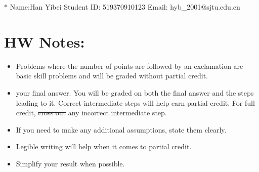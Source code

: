 \documentclass[12pt,a4paper]{article}
\begin{document}
\noindent

\noindent{}

\begin{center}

\footnotesize{\color{blue}$*$ Name:Han Yibei \quad Student ID: 519370910123 \quad Email: hyb\_2001@sjtu.edu.cn}
\end{center}

\section*{HW Notes:}
\begin{itemize}
    \item Problems where the number of points are followed by an exclamation are basic skill problems and will be graded without partial credit.
    \item {} your final answer. You will be graded on both the final answer and the steps leading to it. Correct intermediate steps will help earn partial credit.
    For full credit, \sout{cross out} any incorrect intermediate step.
    \item If you need to make any additional assumptions, state them clearly.
    \item Legible writing will help when it comes to partial credit.
    \item Simplify your result when possible.
\end{itemize}
\end{document}
